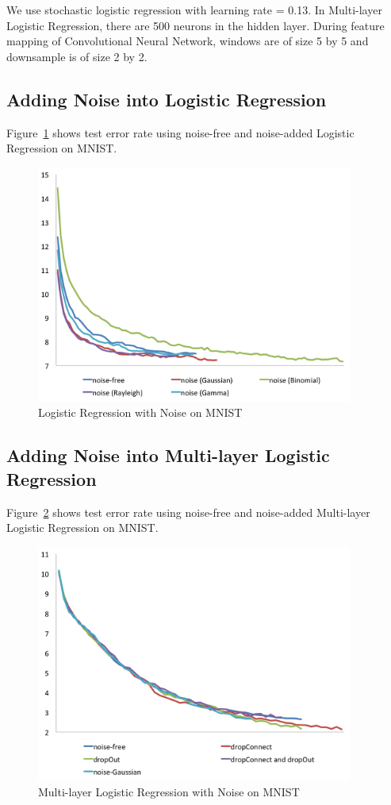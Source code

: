 We use stochastic logistic regression with learning rate = 0.13.
In Multi-layer Logistic Regression, there are 500 neurons in the hidden
layer. During feature mapping of Convolutional Neural Network, windows
are of size 5 by 5 and downsample is of size 2 by 2.

\subsection{Adding Noise into Logistic Regression}
Figure~\ref{logistic} shows test error rate using noise-free and
noise-added Logistic Regression on MNIST.
\begin{figure}[!htbp]
\centering
\includegraphics[width=295pt]{f-figs/logistic.png}
\caption{Logistic Regression with Noise on MNIST}
\label{logistic}
\end{figure}


\subsection{Adding Noise into Multi-layer Logistic Regression}
Figure~\ref{mlp} shows test error rate using noise-free and noise-added
Multi-layer Logistic Regression on MNIST.
\begin{figure}[!htbp]
\centering
\includegraphics[width=295pt]{f-figs/mlp.png}
\caption{Multi-layer Logistic Regression with Noise on MNIST}
\label{mlp}
\end{figure}

